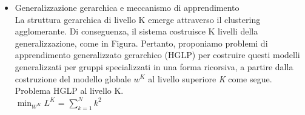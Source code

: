 \begin{itemize}
\item Generalizzazione gerarchica e meccanismo di apprendimento\\

La struttura gerarchica di livello K emerge attraverso il clustering agglomerante. Di conseguenza, il sistema costruisce K livelli della generalizzazione, come in Figura. Pertanto, proponiamo problemi di apprendimento generalizzato gerarchico (HGLP) per costruire questi modelli generalizzati per gruppi specializzati in una forma ricorsiva, a partire dalla costruzione del modello globale $w^K$ al livello superiore \textsl{K} come segue. \\
Problema HGLP al livello K. \\
$\min_{W^K}L^K$ = $\sum_{k=1}^N k^2$

\end{itemize}